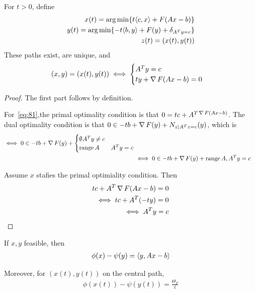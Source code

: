 
\begin{proposition}
  For $t > 0$, define
  \begin{align}
    \label{eq:80}
    x(t) = \argmin \{ t \IP{c, x} + F(Ax - b) \} \\
    y(t) = \argmin \{ -t \IP{b, y} + F(y) + \delta_{A^{T} y = c} \} \\
    z(t) = (x(t), y(t))
  \end{align}
  These paths exist, are unique, and
  \begin{align}
    \label{eq:81}
    (x, y) = (x(t), y(t)) \iff
    \begin{cases}
      A^{T} y = c \\
      ty + \operatorname*{\nabla} F(Ax - b) = 0
    \end{cases}
  \end{align}
\end{proposition}

\begin{proof}
  The first part follows by definition.

  For~\eqref{eq:81},the primal optimality condition is that $0 = tc +
  A^{T \operatorname*{\nabla} F(Ax - b)}$. The dual optimality condition is that $0 \in
  -tb + \operatorname*{\nabla} F(y) + N_{z | A^{T}z = c}(y)$, which is
  \begin{align}
    \label{eq:82}
    \iff 0 \in -tb + \operatorname*{\nabla} F(y) +
    \begin{cases}
      \emptyset ^{} A^{T} y \neq c \\
      \operatorname*{range} A & A^{T} y = c
    \end{cases} \\
    &\iff 0 \in -tb + \operatorname*{\nabla} F(y) + \operatorname*{range} A, A^{T} y = c
  \end{align}

  Assume $x$ stafies the primal optimiality condition.  Then
  \begin{align}
    \label{eq:83}
    tc + A^{T} \operatorname*{\nabla} F(Ax - b) = 0 \\
    \iff tc + A^{T}(-ty) = 0 \\
    \iff A^{T}y = c
  \end{align}
\end{proof}

\begin{proposition}
  If $x, y$ feasible, then
  \begin{align}
    \label{eq:84}
    \phi(x) - \psi(y) = \IP{y, Ax - b}
  \end{align}

  Moreover, for $(x(t), y(t))$ on the central path,
  \begin{align}
    \label{eq:85}
    \phi(x(t)) - \psi(y(t)) = \frac{\Theta_{F}}{t}
  \end{align}
\end{proposition}

